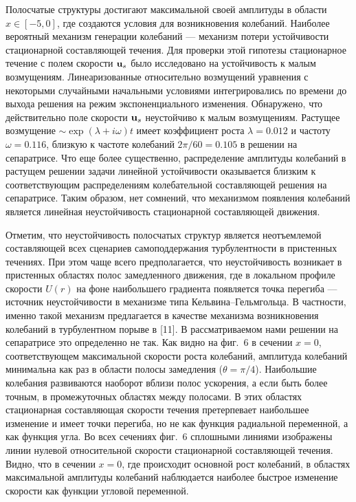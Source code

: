 Полосчатые структуры достигают максимальной своей амплитуды в области $x\in[-5,0]$, где создаются условия для возникновения колебаний. Наиболее вероятный механизм генерации колебаний --- механизм потери устойчивости стационарной составляющей течения. Для проверки этой гипотезы стационарное течение с полем скорости $\mathbf{u}_s$ было исследовано на устойчивость к малым возмущениям. Линеаризованные относительно возмущений уравнения с некоторыми случайными начальными условиями интегрировались по времени до выхода решения на режим экспоненциального изменения. Обнаружено, что действительно поле скорости $\mathbf{u}_s$ неустойчиво к малым возмущениям. Растущее возмущение $\sim\exp(\lambda+i\omega)t$ имеет коэффициент роста $\lambda=0.012$ и частоту $\omega=0.116$, близкую к частоте колебаний $2\pi/60=0.105$ в решении на сепаратрисе. Что еще более существенно, распределение амплитуды колебаний в растущем решении задачи линейной устойчивости оказывается близким к соответствующим распределениям колебательной составляющей решения на сепаратрисе. Таким образом, нет сомнений, что механизмом появления колебаний является линейная неустойчивость стационарной составляющей движения.

Отметим, что неустойчивость полосчатых структур является неотъемлемой составляющей всех сценариев самоподдержания турбулентности в пристенных течениях. При этом чаще всего предполагается, что неустойчивость возникает в пристенных областях полос замедленного движения, где в локальном профиле скорости $U(r)$ на фоне наибольшего градиента появляется точка перегиба --- источник неустойчивости в механизме типа Кельвина--Гельмгольца. В частности, именно такой механизм предлагается в качестве механизма возникновения колебаний в турбулентном порыве в [11]. В рассматриваемом нами решении на сепаратрисе это определенно не так. Как видно на фиг.~6 в сечении $x=0$, соответствующем максимальной скорости роста колебаний, амплитуда колебаний минимальна как раз в области полосы замедления ($\theta=\pi/4$). Наибольшие колебания развиваются наоборот вблизи полос ускорения, а если быть более точным, в промежуточных областях между полосами. В этих областях стационарная составляющая скорости течения претерпевает наибольшее изменение и имеет точки перегиба, но не как функция радиальной переменной, а как функция угла. Во всех сечениях фиг.~6 сплошными линиями изображены линии нулевой относительной скорости стационарной составляющей течения. Видно, что в сечении $x=0$, где происходит основной рост колебаний, в областях максимальной амплитуды колебаний наблюдается наиболее быстрое изменение скорости как функции угловой переменной.

